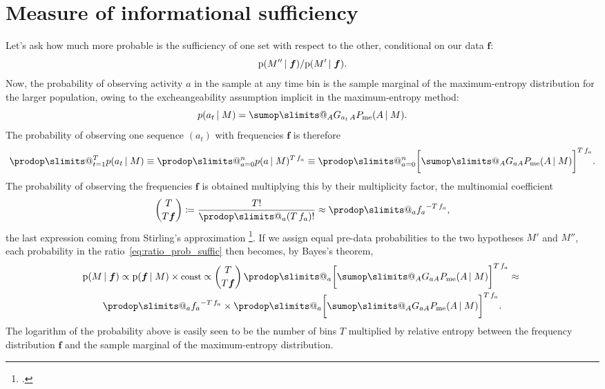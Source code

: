 \documentclass[\ifafour a4paper,12pt,\else a5paper,10pt,\fi%
onecolumn,oneside,article,%
british%
]{memoir}
\makeatletter
\theoremstyle{remark}
\theoremstyle{innote}
\def\sum{\DOTSI\sumop\slimits@}
\def\prod{\DOTSI\prodop\slimits@}
\newcommand*{\citep}{\footcites}
\newcommand*{\defd}{\coloneqq}
\newcommand*{\pf}{\mathrm{p}}%
\renewcommand*{\|}{\nonscript\,\vert\nonscript\;\mathopen{}}
\newcommand*{\yG}{G}
\newcommand*{\yAv}{A}
\newcommand*{\yav}{a}
\newcommand*{\yff}{f}
\newcommand*{\yf}{\bm{\yff}}
\newcommand*{\ya}{\yav}%
\newcommand*{\yA}{\yAv}%
\newcommand*{\px}{P_{\text{me}}}
\newcommand*{\pxx}{p}
\makeatother
\begin{document}
\section{Measure of informational sufficiency}
\label{sec:measure_suff}

Let's ask how much more probable is the
sufficiency of one set with respect to the other, conditional on our data
$\yf$:
\begin{equation}
  \label{eq:ratio_prob_suffic}
  \pf(M'' \| \yf)/
  \pf(M' \| \yf).
\end{equation}
Now, the probability of observing activity $\ya$ in the sample at any time
bin is the sample marginal of the maximum-entropy distribution for the larger
population, owing to the excheangeability assumption implicit in the
maximum-entropy method:
\begin{equation}
  \label{eq:sample_marginal}
  \pxx(\ya_{t} \| M) = \sum_{\yA}\yG_{\ya_{t}\,\yA}\px(\yA \| M).
\end{equation}
The probability of observing one sequence $(\ya_{t})$ with frequencies
$\yf$ is therefore
\begin{equation}
  \label{eq:prob_frequencies}
  \prod_{t=1}^{T} \pxx(\ya_{t} \| M) \equiv
  \prod_{\ya=0}^{n} \pxx(\ya \| M)^{T\,\yff_{\ya}} \equiv
  \prod_{\ya=0}^{n}\biggl[\sum_{\yA}\yG_{\ya\yA}\px(\yA \| M)\biggr]^{T\,\yff_{\ya}}.
\end{equation}
The probability of observing the frequencies $\yf$ is obtained multiplying this
by their multiplicity factor, the multinomial coefficient
\begin{equation}
  \label{eq:multiplicity_factor}
  \binom{T}{T\yf} \defd \frac{T!}{\prod_{\ya}(T\,\yff_{\ya})!}
  \approx \prod_{\ya}{\yff_{\ya}}^{-T\,\yff_{\ya}},
\end{equation}
the last expression coming from Stirling's approximation
\citep[Lemma~2.2]{csiszaretal2004b}.
If we assign equal pre-data probabilities to the two hypotheses $M'$ and $M''$,
each probability in the ratio~\eqref{eq:ratio_prob_suffic} then becomes, by
Bayes's theorem,
\begin{multline}
  \label{eq:prob_proportional_relentropy}
  \pf(M \| \yf) \propto
  \pf(\yf \| M) \times\text{\small const} \propto
  \binom{T}{T\yf}\,  \prod_{\ya}\biggl[\sum_{\yA}\yG_{\ya\yA}\px(\yA \| M)\biggr]^{
    T\,\yff_{\ya}}
   \approx{}\\
  \prod_{\ya}{\yff_{\ya}}^{-T\,\yff_{\ya}}
  \times
  \prod_{\ya}\biggl[\sum_{\yA}\yG_{\ya\yA}\px(\yA \| M)\biggr]^{
    T\,\yff_{\ya}}.
\end{multline}
The logarithm of the probability above is easily seen to be the number of
bins $T$ multiplied by relative entropy between the frequency distribution
$\yf$ and the sample marginal of the maximum-entropy distribution.
\end{document}
